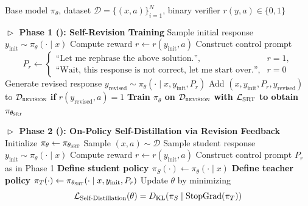\begin{algorithm}[htbp]
\caption{\ours{} Training Pipeline}
\label{alg:pipeline}
\begin{algorithmic}[1]
\small
\Require Base model $\pi_\theta$, dataset $\mathcal{D}=\{(x,a)\}_{i=1}^N$, binary verifier $r(y,a)\in\{0,1\}$
\Statex \vspace{-0.5em}

\Statex \textbf{$\vartriangleright$ Phase 1 (\sft{}): Self-Revision Training}
    \State Sample initial response $y_{\text{init}} \sim \pi_\theta(\cdot \mid x)$
    \State Compute reward $r \gets r(y_{\text{init}}, a)$
    \State Construct control prompt
    \[
    P_r \gets
    \begin{cases}
    \text{``Let me rephrase the above solution.''}, & r=1,\\
    \text{``Wait, this response is not correct, let me start over.''}, & r=0
    \end{cases}
    \]
    \State Generate revised response $y_{\text{revised}} \sim \pi_\theta(\cdot \mid x, y_{\text{init}}, P_r)$
    \State Add $(x, y_{\text{init}}, P_r, y_{\text{revised}})$ to $\mathcal{D}_{\textsc{revision}}$ \textbf{if} $r(y_{\text{revised}}, a)=1$
\EndFor
\State \textcolor{darkbluegreen}{\textbf{Train $\pi_\theta$ on $\mathcal{D}_{\textsc{revision}}$ with $\mathcal{L}_{\text{\textsc{SRT}{}}}$ to obtain $\pi_{\theta_{\textsc{SRT}{}}}$}}

\Statex
\Statex \textbf{$\vartriangleright$ Phase 2 (\opsd{}): On-Policy Self-Distillation via Revision Feedback}
\State Initialize $\pi_\theta \gets \pi_{\theta_{\textsc{SRT}{}}}$
\Repeat
    \State Sample $(x,a)\sim \mathcal{D}$
    \State Sample student response $y_{\text{init}} \sim \pi_\theta(\cdot \mid x)$
    \State Compute reward $r \gets r(y_{\text{init}}, a)$
    \State Construct control prompt $P_r$ as in Phase 1
    \State \textcolor{darkbluegreen}{\textbf{Define student policy $\pi_S(\cdot) \gets \pi_\theta(\cdot \mid x)$}}
    \State \textcolor{darkbluegreen}{\textbf{Define teacher policy $\pi_T(\cdot) \gets \pi_{\theta_{\textsc{SRT}{}}}(\cdot \mid x, y_{\text{init}}, P_r)$}}
    \State Update $\theta$ by minimizing
    \[
    \mathcal{L}_{\text{Self-Distillation{}}}(\theta)
    = D_{\mathrm{KL}}\!\left(\pi_S \,\|\, \text{StopGrad}(\pi_T)\right)
    \]
\end{algorithmic}
\end{algorithm}